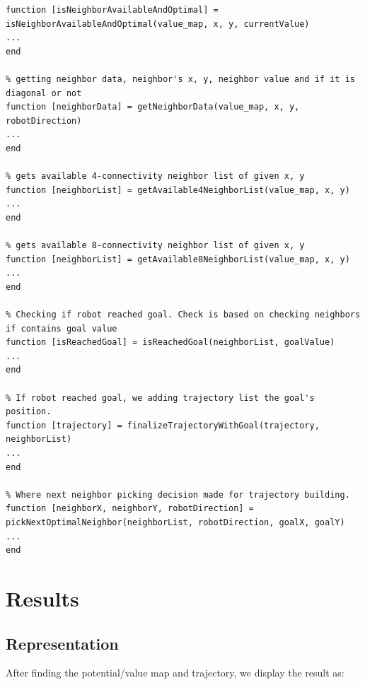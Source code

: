 \documentclass{article}
\begin{document}
\begin{lstlisting}[label=wavefront-m, caption=wavefront.m]
% checking neighbor if avaliable and optimal and If neighbor is in map borders and lower value
function [isNeighborAvailableAndOptimal] = isNeighborAvailableAndOptimal(value_map, x, y, currentValue)
...
end

% getting neighbor data, neighbor's x, y, neighbor value and if it is diagonal or not
function [neighborData] = getNeighborData(value_map, x, y, robotDirection)
...
end

% gets available 4-connectivity neighbor list of given x, y
function [neighborList] = getAvailable4NeighborList(value_map, x, y)
...
end

% gets available 8-connectivity neighbor list of given x, y
function [neighborList] = getAvailable8NeighborList(value_map, x, y)
...
end

% Checking if robot reached goal. Check is based on checking neighbors if contains goal value
function [isReachedGoal] = isReachedGoal(neighborList, goalValue)
...
end

% If robot reached goal, we adding trajectory list the goal's position.
function [trajectory] = finalizeTrajectoryWithGoal(trajectory, neighborList)
...
end

% Where next neighbor picking decision made for trajectory building.
function [neighborX, neighborY, robotDirection] = pickNextOptimalNeighbor(neighborList, robotDirection, goalX, goalY)
...
end

	\end{lstlisting}

\section{Results}

	\subsection{Representation}
	
	After finding the potential/value map and trajectory, we display the result as:
	
\end{document}
